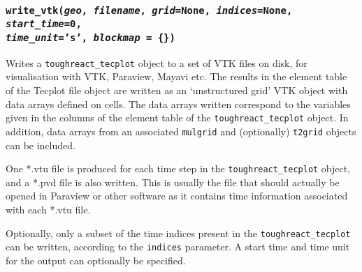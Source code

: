 \begin{snugshade}
\subsubsection{\texttt{write\_vtk(\emph{geo}, \emph{filename}, \emph{grid}=None, \emph{indices}=None, \emph{start\_time}=0,\\
    \emph{time\_unit}='s', \emph{blockmap} = \{\})}}
\end{snugshade}
\label{sec:toughreact_tecplot:write_vtk}

Writes a \texttt{toughreact\_tecplot} object to a set of VTK files on disk, for visualisation with VTK, Paraview, Mayavi etc.  The results in the element table of the Tecplot file object are written as an `unstructured grid' VTK object with data arrays defined on cells.  The data arrays written correspond to the variables given in the columns of the element table of the \texttt{toughreact\_tecplot} object. In addition, data arrays from an associated \texttt{mulgrid} and (optionally) \texttt{t2grid} objects can be included.

One *.vtu file is produced for each time step in the \texttt{toughreact\_tecplot} object, and a *.pvd file is also written.  This is usually the file that should actually be opened in Paraview or other software as it contains time information associated with each *.vtu file.

Optionally, only a subset of the time indices present in the \texttt{toughreact\_tecplot} can be written, according to the \texttt{indices} parameter.  A start time and time unit for the output can optionally be specified.

